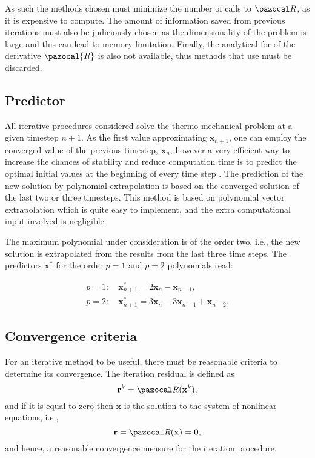 As such the methods chosen must minimize the number of calls to \(\pazocal R\), as it is expensive to compute.
The amount of information saved from previous iterations must also be judiciously chosen as the dimensionality of the problem is large and this can lead to memory limitation.
Finally, the analytical for of the derivative \(\pazocal{R}\) is also not available, thus methods that use must be discarded.

\subsection{Predictor}

All iterative procedures considered solve the thermo-mechanical problem at a given timestep \(n+1\).
As the first value approximating \(\mathbf x_{n+1}\), one can employ the converged value of the previous timestep, \(\mathbf x_n\), however a very efficient way to increase the chances of stability and reduce computation time is to predict the optimal initial values at the beginning of every time step \citep{erbts_accelerated_2012, erbts_partitioned_2015, wendt_partitioned_2015}.
The prediction of the new solution by polynomial extrapolation is based on the converged solution of the last two or three timesteps.
This method is based on polynomial vector extrapolation which is quite easy to implement, and the extra computational input involved is negligible.

The maximum polynomial under consideration is of the order two, i.e., the new solution is extrapolated from the results from the last three time steps.
The predictors $\mathbf{x}^{*}$ for the order $p=1$ and $p=2$ polynomials read:
\begin{highlight}[innertopmargin=-5pt]
\begin{gather}
p=1:\quad \mathbf{x}_{n+1}^{*}=2 \mathbf{x}_{n}-\mathbf{x}_{n-1}, \\
p=2:\quad \mathbf{x}_{n+1}^{*}=3 \mathbf{x}_{n}-3 \mathbf{x}_{n-1}+\mathbf{x}_{n-2}.
\end{gather}
\end{highlight}

\subsection{Convergence criteria}

For an iterative method to be useful, there must be reasonable criteria to determine its convergence.
The iteration residual is defined as
\begin{equation}
\mathbf r^{k} = \pazocal R(\mathbf x^{k}),
\end{equation}
and if it is equal to zero then $\mathbf x$ is the solution to the system of nonlinear equations, i.e.,
\begin{equation} \label{eq:residual_definition}
\mathbf r = \pazocal R(\mathbf x) = \mathbf 0,
\end{equation}
and hence, a reasonable convergence measure for the iteration procedure.

